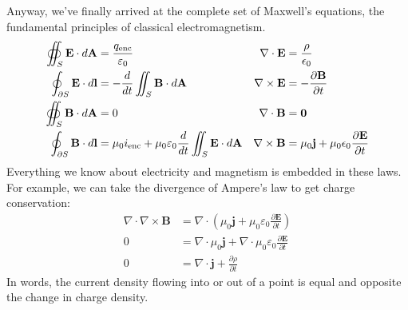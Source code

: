 \documentclass[../p051main.tex]{subfiles}
\begin{document}
Anyway, we've finally arrived at the complete set of Maxwell's equations, the fundamental principles of classical electromagnetism.
\begin{align*}
    \oiint_S \mathbf{E} \cdot d\mathbf{A} &= \frac{q_\text{enc}}{\varepsilon_0} & \nabla \cdot \mathbf{E} &= \frac{\rho}{\epsilon_0} \\
    \oint_{\partial S} \mathbf{E} \cdot d\mathbf{l} &= -\frac{d}{dt} \iint_S \mathbf{B} \cdot d\mathbf{A} & \nabla \times \mathbf{E} &= -\frac{\partial \mathbf{B}}{\partial t} \\
    \oiint_S \mathbf{B} \cdot d\mathbf{A} &= 0 & \nabla \cdot \mathbf{B} &= \mathbf{0} \\
    \oint_{\partial S} \mathbf{B} \cdot d\mathbf{l} &= \mu_0 i_\text{enc} + \mu_0 \varepsilon_0 \frac{d}{dt}\iint_S \mathbf{E} \cdot d\mathbf{A} & \nabla \times \mathbf{B} &= \mu_0 \mathbf{j} + \mu_0 \epsilon_0 \frac{\partial \mathbf{E}}{\partial t}
\end{align*}
Everything we know about electricity and magnetism is embedded in these laws.
For example, we can take the divergence of Ampere's law to get charge conservation:
\begin{align*}
    \nabla \cdot \nabla \times \mathbf{B} &= \nabla \cdot \left( \mu_0 \mathbf{j} + \mu_0 \varepsilon_0 \frac{\partial \mathbf{E}}{\partial t} \right) \\
    0 &= \nabla \cdot \mu_0 \mathbf{j} +  \nabla \cdot \mu_0 \varepsilon_0 \frac{\partial \mathbf{E}}{\partial t} \\
    0 &= \nabla \cdot \mathbf{j} + \frac{\partial \rho}{\partial t}
\end{align*}
In words, the current density flowing into or out of a point is equal and opposite the change in charge density.
\end{document}
